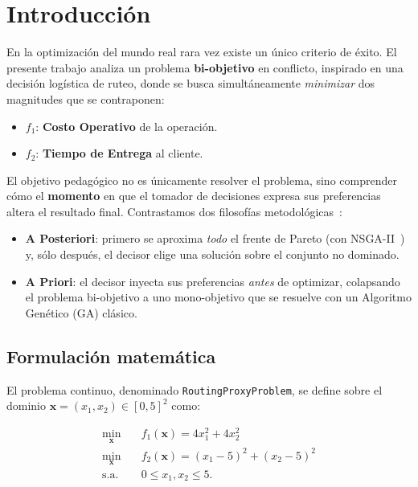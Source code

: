 \section{Introducción}

En la optimización del mundo real rara vez existe un único criterio de éxito.
El presente trabajo analiza un problema \textbf{bi-objetivo} en conflicto,
inspirado en una decisión logística de ruteo, donde se busca simultáneamente
\emph{minimizar} dos magnitudes que se contraponen:

\begin{itemize}[noitemsep]
  \item $f_1$: \textbf{Costo Operativo} de la operación.
  \item $f_2$: \textbf{Tiempo de Entrega} al cliente.
\end{itemize}

El objetivo pedagógico no es únicamente resolver el problema, sino comprender
cómo el \textbf{momento} en que el tomador de decisiones expresa sus
preferencias altera el resultado final. Contrastamos dos filosofías
metodológicas~\cite{miettinen1999nonlinear,marler2004survey}:

\begin{itemize}[noitemsep]
  \item \textbf{A Posteriori}: primero se aproxima \emph{todo} el frente de
        Pareto (con NSGA-II~\cite{deb2002nsga2}) y, sólo después, el decisor
        elige una solución sobre el conjunto no dominado.
  \item \textbf{A Priori}: el decisor inyecta sus preferencias
        \emph{antes} de optimizar, colapsando el problema bi-objetivo a uno
        mono-objetivo que se resuelve con un Algoritmo Genético (GA) clásico.
\end{itemize}

\subsection{Formulación matemática}

El problema continuo, denominado \texttt{RoutingProxyProblem}, se define sobre
el dominio $\mathbf{x} = (x_1, x_2) \in [0, 5]^2$ como:

\begin{align}
  \min_{\mathbf{x}} \quad & f_1(\mathbf{x}) = 4x_1^2 + 4x_2^2 \\
  \min_{\mathbf{x}} \quad & f_2(\mathbf{x}) = (x_1 - 5)^2 + (x_2 - 5)^2 \\
  \text{s.a.} \quad & 0 \le x_1, x_2 \le 5 . \nonumber
\end{align}

